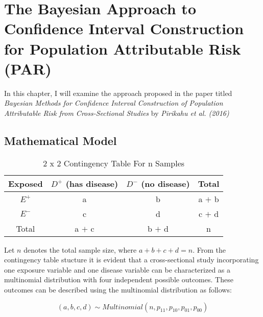 \chapter{The Bayesian Approach to Confidence Interval Construction for Population Attributable Risk (PAR)} \label{sec:bayesian-model}

In this chapter, I will examine the approach proposed in the paper titled \textit{Bayesian Methods for Confidence Interval Construction of Population Attributable Risk from Cross-Sectional Studies} by \textit{Pirikahu et al. (2016)}

\section{Mathematical Model} \label{PiriMath}
\begin{table}[ht]
\centering
\caption{2 x 2 Contingency Table For n Samples}
\label{contingency-table}
\begin{tabular}{|c|c|c|c|}
\hline
Exposed & $D^+$ (has disease) & $D^-$ (no disease) & Total \\ \hline
$E^+$ & a & b & a $+$ b \\ \hline
$E^-$ & c & d & c $+$ d \\ \hline
Total & a $+$ c & b $+$ d & n \\ \hline
\end{tabular}
\end{table}

Let $n$ denotes the total sample size, where $a + b + c + d = n$. From the contingency table stucture it is evident that a cross-sectional study incorporating one exposure variable and one disease variable can be characterized as a multinomial distribution with four independent possible outcomes. These outcomes can be described using the multinomial distribution as follows:

\begin{equation} \label{multinomial}
(a, b, c, d) \sim Multinomial(n, p_{11}, p_{10}, p_{01}, p_{00})
\end{equation}

